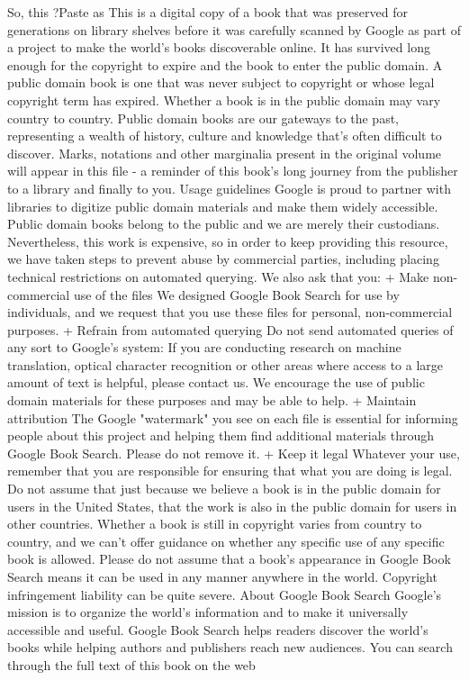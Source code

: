 \documentclass[a4paper]{article}
\begin{document}
So, this ?Paste as %
This is a digital copy of a book that was preserved for generations on library shelves before it was carefully scanned by Google as part of a project 
to make the world's books discoverable online. 
It has survived long enough for the copyright to expire and the book to enter the public domain. A public domain book is one that was never subject 
to copyright or whose legal copyright term has expired. Whether a book is in the public domain may vary country to country. Public domain books 
are our gateways to the past, representing a wealth of history, culture and knowledge that's often difficult to discover. 
Marks, notations and other marginalia present in the original volume will appear in this file - a reminder of this book's long journey from the 
publisher to a library and finally to you. 
Usage guidelines 
Google is proud to partner with libraries to digitize public domain materials and make them widely accessible. Public domain books belong to the 
public and we are merely their custodians. Nevertheless, this work is expensive, so in order to keep providing this resource, we have taken steps to 
prevent abuse by commercial parties, including placing technical restrictions on automated querying. 
We also ask that you: 
+ Make non-commercial use of the files We designed Google Book Search for use by individuals, and we request that you use these files for 
personal, non-commercial purposes. 
+ Refrain from automated querying Do not send automated queries of any sort to Google's system: If you are conducting research on machine 
translation, optical character recognition or other areas where access to a large amount of text is helpful, please contact us. We encourage the 
use of public domain materials for these purposes and may be able to help. 
+ Maintain attribution The Google "watermark" you see on each file is essential for informing people about this project and helping them find 
additional materials through Google Book Search. Please do not remove it. 
+ Keep it legal Whatever your use, remember that you are responsible for ensuring that what you are doing is legal. Do not assume that just 
because we believe a book is in the public domain for users in the United States, that the work is also in the public domain for users in other 
countries. Whether a book is still in copyright varies from country to country, and we can't offer guidance on whether any specific use of 
any specific book is allowed. Please do not assume that a book's appearance in Google Book Search means it can be used in any manner 
anywhere in the world. Copyright infringement liability can be quite severe. 
About Google Book Search 
Google's mission is to organize the world's information and to make it universally accessible and useful. Google Book Search helps readers 
discover the world's books while helping authors and publishers reach new audiences. You can search through the full text of this book on the web 
\end{document}
